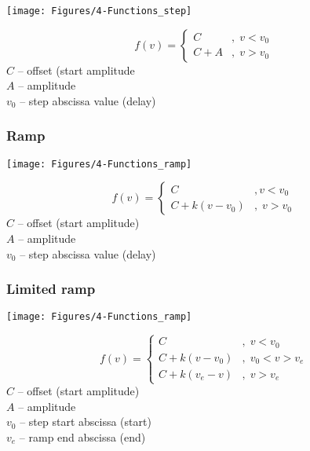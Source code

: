 \noindent
\begin{minipage}{0.45\textwidth}
  \texttt{[image: Figures/4-Functions\_step]}
\end{minipage}%
\hfill\begin{minipage}{0.5\textwidth}
  $$
    f(v)=\left\{\begin{array}{ll}
      C   &,\; v < v_0 \\
      C+A &,\; v > v_0
    \end{array}\right.
  $$
  $C$ -- offset (start amplitude \\
  $A$ -- amplitude \\
  $v_0$ -- step abscissa value (delay)
\end{minipage}

\subsubsection{Ramp}

\noindent
\begin{minipage}{0.45\textwidth}
  \texttt{[image: Figures/4-Functions\_ramp]}
\end{minipage}%
\hfill\begin{minipage}{0.5\textwidth}
  $$
    f(v)=\left\{\begin{array}{ll}
      C          &, v < v_0 \\
      C+k(v-v_0) &,\; v > v_0
    \end{array}\right.
  $$
  $C$ -- offset (start amplitude) \\
  $A$ -- amplitude \\
  $v_0$ -- step abscissa value (delay)
\end{minipage}

\subsubsection{Limited ramp}

\noindent
\begin{minipage}{0.45\textwidth}
  \texttt{[image: Figures/4-Functions\_ramp]}
\end{minipage}%
\hfill\begin{minipage}{0.5\textwidth}
  $$
    f(v)=\left\{\begin{array}{ll}
      C          &,\; v < v_0 \\
      C+k(v-v_0) &,\; v_0 < v > v_e \\
      C+k(v_e-v) &,\; v > v_e
    \end{array}\right.
  $$
  $C$ -- offset (start amplitude) \\
  $A$ -- amplitude \\
  $v_0$ -- step start abscissa (start) \\
  $v_e$ -- ramp end abscissa (end)
\end{minipage}

